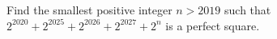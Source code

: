 Find the smallest positive integer $n>2019$ such that $2^{2020}+2^{2025}+2^{2026}+2^{2027}+2^n$ is a perfect square.
